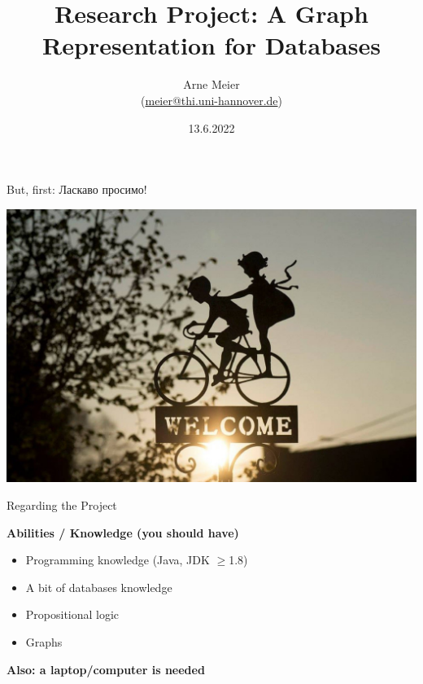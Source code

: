 \documentclass[aspectratio=169]{beamer}
\title{Research Project: A Graph Representation for Databases}
\author{Arne Meier\\(\url{meier@thi.uni-hannover.de})}
\date{13.6.2022}
\begin{document}
\begin{frame}
    \maketitle
\end{frame}

\begin{frame}{But, first: Ласкаво просимо!}
    \begin{center}
    	\includegraphics[width=.8\linewidth]{sign-741813_1280.jpg}
    \end{center}
\end{frame}

\begin{frame}{Regarding the Project}

\textbf{Abilities / Knowledge (you should have)}
\begin{itemize}
	\item Programming knowledge (Java, JDK $\ge$1.8)
	\item A bit of databases knowledge
	\item Propositional logic
	\item Graphs
\end{itemize}

\textbf{Also: a laptop/computer is needed}

\end{frame}
\end{document}
